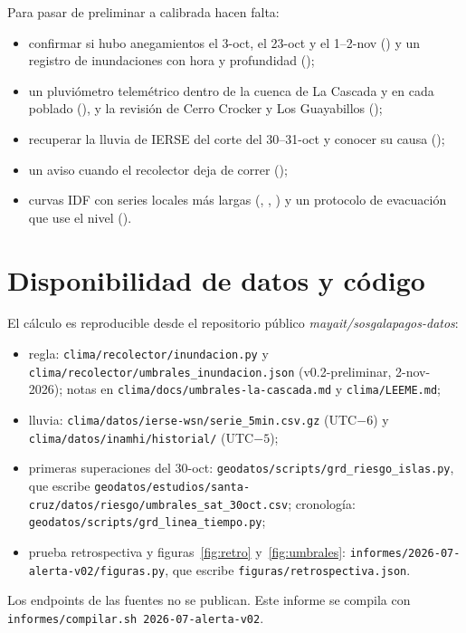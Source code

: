 \documentclass{sosg-informe}
\begin{document}
Para pasar de preliminar a calibrada hacen falta:
\begin{itemize}
  \item confirmar si hubo anegamientos el 3-oct, el 23-oct y el 1--2-nov () y un registro de inundaciones con hora y profundidad ();
  \item un pluviómetro telemétrico dentro de la cuenca de La Cascada y en cada poblado (), y la revisión de Cerro Crocker y Los Guayabillos ();
  \item recuperar la lluvia de IERSE del corte del 30--31-oct y conocer su causa ();
  \item un aviso cuando el recolector deja de correr ();
  \item curvas IDF con series locales más largas (, , ) y un protocolo de evacuación que use el nivel ().
\end{itemize}

\section*{Disponibilidad de datos y código}
{\small\raggedright El cálculo es reproducible desde el repositorio público \emph{mayait/sosgalapagos-datos}:
\begin{itemize}
  \item regla: \texttt{clima/recolector/inundacion.py} y \texttt{clima/recolector/umbrales\_inundacion.json} (v0.2-preliminar, 2-nov-2026); notas en \texttt{clima/docs/umbrales-la-cascada.md} y \texttt{clima/LEEME.md};
  \item lluvia: \texttt{clima/datos/ierse-wsn/serie\_5min.csv.gz} (UTC$-6$) y \texttt{clima/datos/inamhi/historial/} (UTC$-5$);
  \item primeras superaciones del 30-oct: \texttt{geodatos/scripts/grd\_riesgo\_islas.py}, que escribe \texttt{geodatos/estudios/santa-cruz/\allowbreak datos/riesgo/umbrales\_sat\_30oct.csv}; cronología: \texttt{geodatos/scripts/grd\_linea\_tiempo.py};
  \item prueba retrospectiva y figuras~\ref{fig:retro} y~\ref{fig:umbrales}: \texttt{informes/2026-07-alerta-v02/figuras.py}, que escribe \texttt{figuras/retrospectiva.json}.
\end{itemize}
Los endpoints de las fuentes no se publican. Este informe se compila con \texttt{informes/compilar.sh 2026-07-alerta-v02}.\par}



\end{document}
